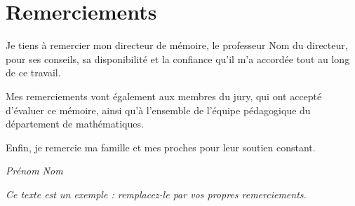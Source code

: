 \chapter*{Remerciements}

Je tiens à remercier mon directeur de mémoire, le professeur Nom du directeur, pour ses conseils, sa disponibilité et la confiance qu'il m'a accordée tout au long de ce travail.

Mes remerciements vont également aux membres du jury, qui ont accepté d'évaluer ce mémoire, ainsi qu'à l'ensemble de l'équipe pédagogique du département de mathématiques.

Enfin, je remercie ma famille et mes proches pour leur soutien constant.

\medskip
\begin{flushright}
  \itshape Prénom Nom
\end{flushright}

\vfill
{\small\itshape Ce texte est un exemple : remplacez-le par vos propres remerciements.}

